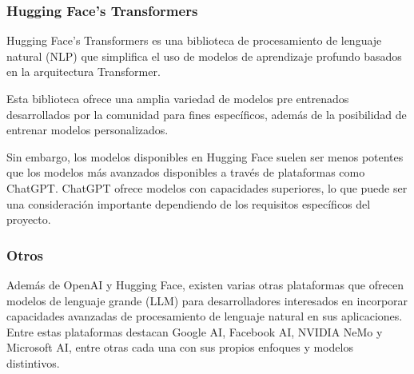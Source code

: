 \subsubsection*{Hugging Face's Transformers}
Hugging Face's Transformers
es una biblioteca de procesamiento de lenguaje natural (NLP) que simplifica el uso de modelos de aprendizaje profundo
basados en la arquitectura Transformer.

Esta biblioteca ofrece una amplia variedad de modelos pre entrenados desarrollados por la comunidad
para fines específicos, además de la posibilidad de entrenar modelos personalizados.


Sin embargo, los modelos disponibles en Hugging Face suelen ser menos potentes que los modelos más
avanzados disponibles a través de plataformas como ChatGPT. ChatGPT ofrece
modelos con capacidades superiores, lo que puede ser una
consideración importante dependiendo de los requisitos específicos del proyecto.

\subsubsection*{Otros}
Además de OpenAI y Hugging Face, existen varias otras plataformas que ofrecen modelos de lenguaje
grande (LLM) para desarrolladores interesados en incorporar capacidades
avanzadas de procesamiento de lenguaje natural en sus aplicaciones. Entre
estas plataformas destacan Google AI, Facebook AI, NVIDIA NeMo y Microsoft AI, entre otras cada una con sus propios
enfoques y modelos distintivos.

